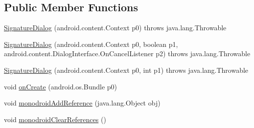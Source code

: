 \subsection*{Public Member Functions}
\begin{DoxyCompactItemize}
\item 
\hyperlink{classfieldservice_1_1android_1_1dialogs_1_1_signature_dialog_abf94406655eb5a23ebb70a65bb71e0ac}{Signature\+Dialog} (android.\+content.\+Context p0)  throws java.\+lang.\+Throwable 	
\item 
\hyperlink{classfieldservice_1_1android_1_1dialogs_1_1_signature_dialog_aca7b4f797e021c81771f60beed641243}{Signature\+Dialog} (android.\+content.\+Context p0, boolean p1, android.\+content.\+Dialog\+Interface.\+On\+Cancel\+Listener p2)  throws java.\+lang.\+Throwable 	
\item 
\hyperlink{classfieldservice_1_1android_1_1dialogs_1_1_signature_dialog_a0f3908805918736252ab6e3c09ca53f7}{Signature\+Dialog} (android.\+content.\+Context p0, int p1)  throws java.\+lang.\+Throwable 	
\item 
void \hyperlink{classfieldservice_1_1android_1_1dialogs_1_1_signature_dialog_a5749efdd9520c94adb85e6842479bb33}{on\+Create} (android.\+os.\+Bundle p0)
\item 
void \hyperlink{classfieldservice_1_1android_1_1dialogs_1_1_signature_dialog_abc9cdaf9db6717c6e8184e8e4b10a73d}{monodroid\+Add\+Reference} (java.\+lang.\+Object obj)
\item 
void \hyperlink{classfieldservice_1_1android_1_1dialogs_1_1_signature_dialog_a03fb20495b41289ce127c114944c3154}{monodroid\+Clear\+References} ()
\end{DoxyCompactItemize}


